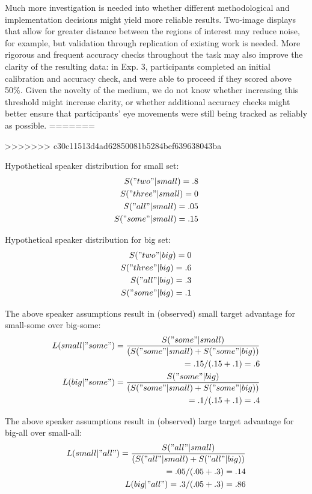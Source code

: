 \documentclass[10pt,letterpaper]{article}
\begin{document}
Much more investigation is needed into whether different methodological and implementation decisions might yield more reliable results. Two-image displays that allow for greater distance between the regions of interest may reduce noise, for example, but validation through replication of existing work is needed. More rigorous and frequent accuracy checks throughout the task may also improve the clarity of the resulting data: in Exp. 3, participants completed an initial calibration and accuracy check, and were able to proceed if they scored above 50\%. Given the novelty of the medium, we do not know whether increasing this threshold might increase clarity, or whether additional accuracy checks might better ensure that participants' eye movements were still being tracked as reliably as possible. 
=======

>>>>>>> c30c11513d4ad62850081b5284bef639638043ba

Hypothetical speaker distribution for small set:
\begin{eqnarray*}
S("two"|small) = .8\\
S("three"|small) = 0\\
S("all"|small) = .05\\
S("some"|small) = .15\\
\end{eqnarray*}

Hypothetical speaker distribution for big set:
\begin{eqnarray*}
S("two"|big) = 0\\
S("three"|big) = .6\\
S("all"|big) = .3\\
S("some"|big) = .1\\
\end{eqnarray*}

The above speaker assumptions result in (observed) small target advantage for small-some over big-some:
\begin{eqnarray*}
L(small|"some") =  \frac{S("some"|small)}{(S("some"|small) + S("some"|big))} \\
= .15 / (.15+.1) = .6\\
L(big|"some") = \frac{S("some"|big)}{(S("some"|small) + S("some"|big))} \\
= .1 / (.15+.1) = .4
\end{eqnarray*}

The above speaker assumptions result in (observed) large target advantage for big-all over small-all:
\begin{eqnarray*}
L(small|"all") = \frac{S("all"|small)}{(S("all"|small) + S("all"|big))}\\ 
= .05 / (.05+.3) = .14\\
L(big|"all") = .3 / (.05+.3) = .86
\end{eqnarray*}
\end{document}
